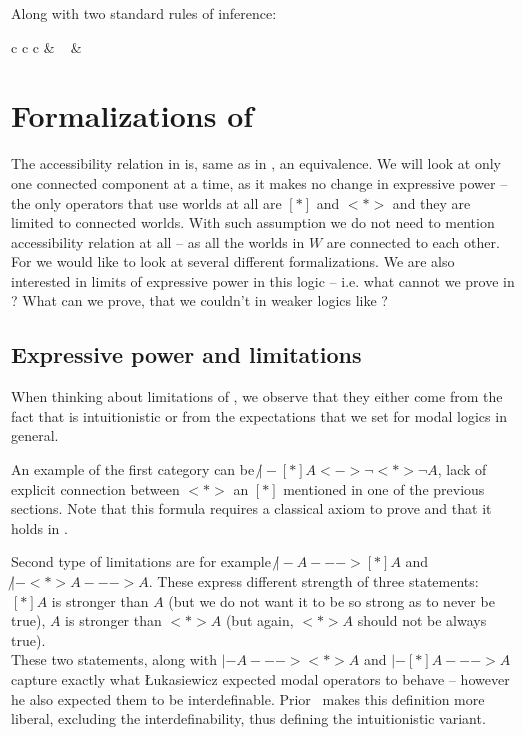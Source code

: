 Along with two standard rules of inference:
\begin{center}
\begin{tabular} { c c c }
 & ~ &
\end{tabular}
\end{center}

\section{Formalizations of \logic{}}

The accessibility relation in \logic{} is, same as in \clogic{}, an equivalence. We will look at only one connected component at a time, as it makes no change in expressive power -- the only operators that use worlds at all are $[*]$ and $<*>$ and they are limited to connected worlds.
With such assumption we do not need to mention accessibility relation at all -- as all the worlds in $W$ are connected to each other. \\

For \logic{} we would like to look at several different formalizations. We are also interested in limits of expressive power in this logic -- i.e. what cannot we prove in \logic{}? What can we prove, that we couldn't in weaker logics like \logiciSfour{}?

\subsection{Expressive power and limitations}
When thinking about limitations of \logic{}, we observe that they either come from the fact that \logic{} is intuitionistic or from the expectations that we set for modal logics in general. 

An example of the first category can be $\not |- [*]A <-> \neg <*> \neg A$, lack of explicit connection between $<*>$ an $[*]$ mentioned in one of the previous sections. Note that this formula requires a classical axiom to prove and that it holds in \clogic{}.

Second type of limitations are for example $\not |- A ---> [*]A$ and $\not |- <*> A ---> A$. These express different strength of three statements: $[*]A$ is stronger than $A$ (but we do not want it to be so strong as to never be true), $A$ is stronger than $<*>A$ (but again, $<*> A$ should not be always true).\\
These two statements, along with $ |- A ---> <*> A$ and $ |- [*]A ---> A$ capture exactly what Łukasiewicz expected modal operators to behave -- however he also expected them to be interdefinable. Prior~\cite{prior55} makes this definition more liberal, excluding the interdefinability, thus defining the intuitionistic variant.\\

